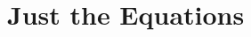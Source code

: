 \documentclass[a4paper,12pt]{article}
\begin{document}
%
%
%
%
%


\clearpage
\section{Just the Equations}
\end{document}
